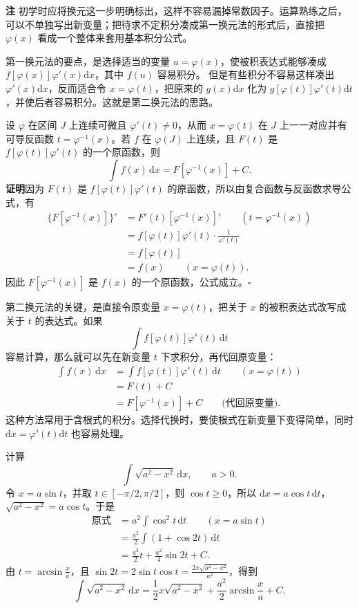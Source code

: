 \documentclass[fontset=fandol]{ctexart}
\newenvironment{remark}{\par\noindent\textbf{注}\quad}{\par\vspace{0.8em}}
\newcommand{\dd}{\mathrm{d}}
\begin{document}
\begin{remark}
初学时应将换元这一步明确标出，这样不容易漏掉常数因子。运算熟练之后，可以不单独写出新变量；把待求不定积分凑成第一换元法的形式后，直接把 $\varphi(x)$ 看成一个整体来套用基本积分公式。
\end{remark}

第一换元法的要点，是选择适当的变量 $u=\varphi(x)$，使被积表达式能够凑成 $f[\varphi(x)]\varphi'(x)\dd x$，其中 $f(u)$ 容易积分。
但是有些积分不容易这样凑出 $\varphi'(x)\dd x$，反而适合令 $x=\varphi(t)$，把原来的 $g(x)\dd x$ 化为 $g[\varphi(t)]\varphi'(t)\dd t$，并使后者容易积分。这就是第二换元法的思路。

\begin{theorem}[第二换元法]
设 \(\varphi\) 在区间 \(J\) 上连续可微且 \(\varphi'(t)\neq0\)，从而 \(x=\varphi(t)\) 在 \(J\) 上一一对应并有可导反函数 \(t=\varphi^{-1}(x)\)。若 \(f\) 在 \(\varphi(J)\) 上连续，且 \(F(t)\) 是 \(f[\varphi(t)]\varphi'(t)\) 的一个原函数，则
\[
\int f(x)\,\dd x=F[\varphi^{-1}(x)]+C.
\]
\textbf{证明}\quad 因为 $F(t)$ 是 $f[\varphi(t)]\varphi'(t)$ 的原函数，所以由复合函数与反函数求导公式，有
\[
\begin{aligned}
\{F[\varphi^{-1}(x)]\}'
&=F'(t)[\varphi^{-1}(x)]'\qquad (t=\varphi^{-1}(x))\\
&=f[\varphi(t)]\varphi'(t)\cdot\frac{1}{\varphi'(t)}\\
&=f[\varphi(t)]\\
&=f(x)\qquad (x=\varphi(t)).
\end{aligned}
\]
因此 $F[\varphi^{-1}(x)]$ 是 $f(x)$ 的一个原函数，公式成立。\hfill$\square$
\end{theorem}

第二换元法的关键，是直接令原变量 $x=\varphi(t)$，把关于 $x$ 的被积表达式改写成关于 $t$ 的表达式。如果
\[
\int f[\varphi(t)]\varphi'(t)\,\dd t
\]
容易计算，那么就可以先在新变量 $t$ 下求积分，再代回原变量：
\[
\begin{aligned}
\int f(x)\,\dd x
&=\int f[\varphi(t)]\varphi'(t)\,\dd t\qquad (x=\varphi(t))\\
&=F(t)+C\\
&=F[\varphi^{-1}(x)]+C\qquad \text{(代回原变量)}.
\end{aligned}
\]
这种方法常用于含根式的积分。选择代换时，要使根式在新变量下变得简单，同时 $\dd x=\varphi'(t)\dd t$ 也容易处理。

\begin{example}[平方差根式]
计算
\[
\int \sqrt{a^2-x^2}\,\dd x,\qquad a>0.
\]
令 \(x=a\sin t\)，并取 \(t\in[-\pi/2,\pi/2]\)，则 \(\cos t\geq0\)，所以 \(\dd x=a\cos t\,\dd t\)，\(\sqrt{a^2-x^2}=a\cos t\)。于是
\[
\begin{aligned}
\text{原式}
&=a^2\int \cos^2t\,\dd t\qquad (x=a\sin t)\\
&=\frac{a^2}{2}\int(1+\cos2t)\,\dd t\\
&=\frac{a^2}{2}t+\frac{a^2}{4}\sin2t+C.
\end{aligned}
\]
由 $t=\arcsin\frac xa$，且 $\sin2t=2\sin t\cos t=\frac{2x\sqrt{a^2-x^2}}{a^2}$，得到
\[
\int \sqrt{a^2-x^2}\,\dd x
=\frac12x\sqrt{a^2-x^2}+\frac{a^2}{2}\arcsin\frac xa+C.
\]
\end{example}
\end{document}
